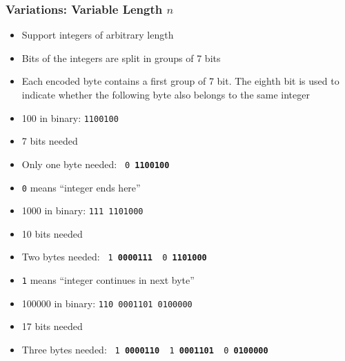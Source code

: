 \begin{frame}
  \frametitle{Variations: Variable Length $n$}
  \begin{itemize}
    \item Support integers of arbitrary length
    \item Bits of the integers are split in groups of 7 bits
    \item Each encoded byte contains a first group of 7 bit. The eighth bit is used to indicate whether
          the following byte also belongs to the same integer
  \end{itemize}
  \begin{overprint}
    \begin{itemize}
      \item 100 in binary: \texttt{1100100}
      \item 7 bits needed
      \item Only one byte needed: \texttt{{\color{red} 0}\kern1pt {\bfseries 1100100}}
      \item {\color{red}\tt 0} means ``integer ends here''
    \end{itemize}

    \begin{itemize}
      \item 1000 in binary: \texttt{111\kern2pt 1101000}
      \item 10 bits needed
      \item Two bytes needed: \texttt{{\color{red} 1}\kern1pt {\bfseries 0000111} {\color{red} 0}\kern1pt {\bfseries 1101000}}
      \item {\color{red}\tt 1} means ``integer continues in next byte''
    \end{itemize}

    \begin{itemize}
      \item 100000 in binary: \texttt{110\kern2pt 0001101\kern2pt 0100000}
      \item 17 bits needed
      \item Three bytes needed: \texttt{{\color{red} 1}\kern1pt {\bfseries 0000110} {\color{red} 1}\kern1pt {\bfseries 0001101} {\color{red} 0}\kern1pt {\bfseries 0100000}}
    \end{itemize}
  \end{overprint}
\end{frame}




